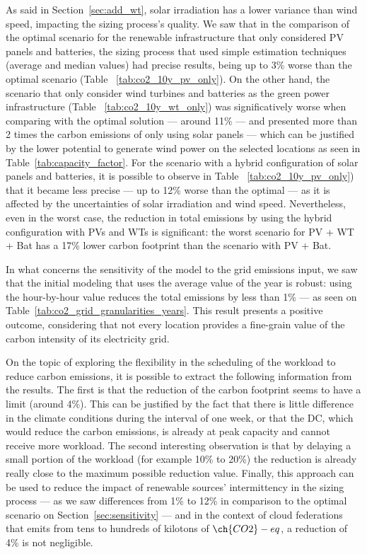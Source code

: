
As said in Section~\ref{sec:add_wt}, solar irradiation has a lower variance than wind speed, impacting the sizing process's quality. We saw that in the comparison of the optimal scenario for the renewable infrastructure that only considered PV panels and batteries, the sizing process that used simple estimation techniques (average and median values) had precise results, being up to 3\% worse than the optimal scenario (Table ~\ref{tab:co2_10y_pv_only}). On the other hand, the scenario that only consider wind turbines and batteries as the green power infrastructure (Table ~\ref{tab:co2_10y_wt_only}) was significatively worse when comparing with the optimal solution ---  around 11\% --- and presented more than 2 times the carbon emissions of only using solar panels --- which can be justified by the lower potential to generate wind power on the selected locations as seen in Table~\ref{tab:capacity_factor}. For the scenario with a hybrid configuration of solar panels and batteries, it is possible to observe in Table ~\ref{tab:co2_10y_pv_only}) that it became less precise --- up to 12\% worse than the optimal --- as it is affected by the uncertainties of solar irradiation and wind speed. Nevertheless, even in the worst case, the reduction in total  emissions by using the hybrid configuration with PVs and WTs is significant: the worst scenario for PV + WT + Bat has a 17\% lower carbon footprint than the scenario with PV + Bat.


In what concerns the sensitivity of the model to the grid emissions input, we saw that the initial modeling that uses the average value of the year is robust: using the hour-by-hour value reduces the total  emissions by less than 1\% --- as seen on Table~\ref{tab:co2_grid_granularities_years}. This result presents a positive outcome, considering that not every location provides a fine-grain value of the carbon intensity of its electricity grid.


On the topic of exploring the flexibility in the scheduling of the workload to reduce carbon emissions, it is possible to extract the following information from the results. The first is that the reduction of the carbon footprint seems to have a limit (around 4\%). This can be justified by the fact that there is little difference in the climate conditions during the interval of one week, or that the DC, which would reduce the carbon emissions, is already at peak capacity and cannot receive more workload. The second interesting observation is that by delaying a small portion of the workload (for example 10\% to 20\%)  the reduction is already really close to the maximum possible reduction value. Finally, this approach can be used to reduce the impact of renewable sources' intermittency in the sizing process --- as we saw differences from 1\% to 12\% in comparison to the optimal scenario on Section~\ref{sec:sensitivity} --- and in the context of cloud federations that emits from tens to hundreds of kilotons of $\ch{CO2}-eq$, a reduction of 4\% is not negligible.


